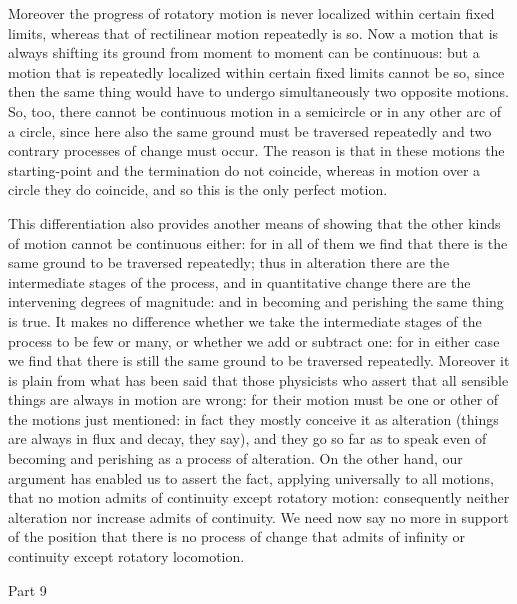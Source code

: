 Moreover the progress of rotatory motion is never localized within
certain fixed limits, whereas that of rectilinear motion repeatedly
is so. Now a motion that is always shifting its ground from moment
to moment can be continuous: but a motion that is repeatedly localized
within certain fixed limits cannot be so, since then the same thing
would have to undergo simultaneously two opposite motions. So, too,
there cannot be continuous motion in a semicircle or in any other
arc of a circle, since here also the same ground must be traversed
repeatedly and two contrary processes of change must occur. The reason
is that in these motions the starting-point and the termination do
not coincide, whereas in motion over a circle they do coincide, and
so this is the only perfect motion. 

This differentiation also provides another means of showing that the
other kinds of motion cannot be continuous either: for in all of them
we find that there is the same ground to be traversed repeatedly;
thus in alteration there are the intermediate stages of the process,
and in quantitative change there are the intervening degrees of magnitude:
and in becoming and perishing the same thing is true. It makes no
difference whether we take the intermediate stages of the process
to be few or many, or whether we add or subtract one: for in either
case we find that there is still the same ground to be traversed repeatedly.
Moreover it is plain from what has been said that those physicists
who assert that all sensible things are always in motion are wrong:
for their motion must be one or other of the motions just mentioned:
in fact they mostly conceive it as alteration (things are always in
flux and decay, they say), and they go so far as to speak even of
becoming and perishing as a process of alteration. On the other hand,
our argument has enabled us to assert the fact, applying universally
to all motions, that no motion admits of continuity except rotatory
motion: consequently neither alteration nor increase admits of continuity.
We need now say no more in support of the position that there is no
process of change that admits of infinity or continuity except rotatory
locomotion. 

Part 9

